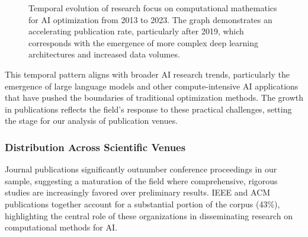 \begin{figure}[h]
\centering
{}
\caption{Temporal evolution of research focus on computational mathematics for AI optimization from 2013 to 2023. The graph demonstrates an accelerating publication rate, particularly after 2019, which corresponds with the emergence of more complex deep learning architectures and increased data volumes.}
\label{fig:temporal_evolution}
\end{figure}

This temporal pattern aligns with broader AI research trends, particularly the emergence of large language models and other compute-intensive AI applications that have pushed the boundaries of traditional optimization methods. The growth in publications reflects the field's response to these practical challenges, setting the stage for our analysis of publication venues.

\subsubsection{Distribution Across Scientific Venues}
Journal publications significantly outnumber conference proceedings in our sample, suggesting a maturation of the field where comprehensive, rigorous studies are increasingly favored over preliminary results. IEEE and ACM publications together account for a substantial portion of the corpus (43\%), highlighting the central role of these organizations in disseminating research on computational methods for AI.

